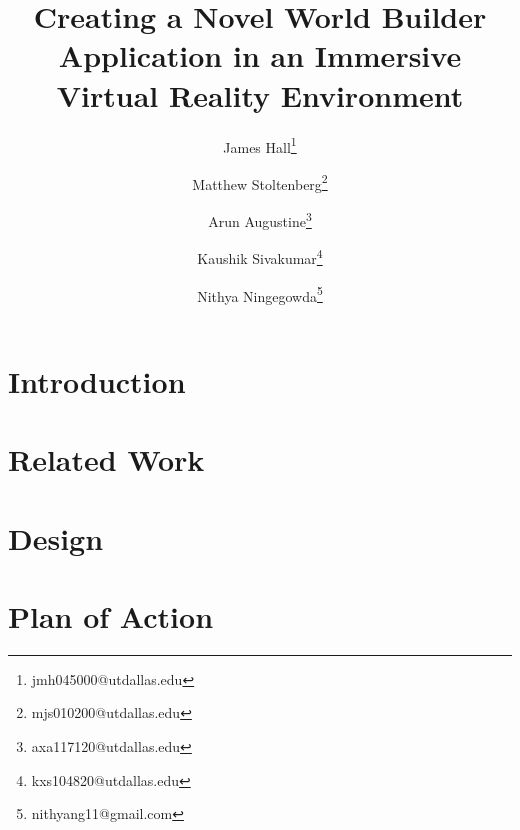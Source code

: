 \documentclass{vgtc}
\title{Creating a Novel World Builder Application in an Immersive Virtual Reality Environment}
\author{James Hall\thanks{jmh045000@utdallas.edu} %
\and Matthew Stoltenberg\thanks{mjs010200@utdallas.edu} %
\and Arun Augustine\thanks{axa117120@utdallas.edu} %
\and Kaushik Sivakumar\thanks{kxs104820@utdallas.edu} %
\and Nithya Ningegowda\thanks{nithyang11@gmail.com}}
\begin{document}

\maketitle

\section{Introduction}


\section{Related Work}


\section{Design}


\section{Plan of Action}




\end{document}
